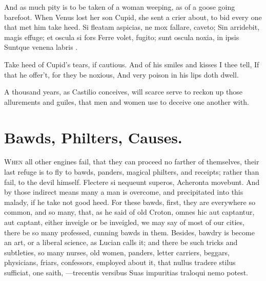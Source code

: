 {And as much pity is to be taken of a woman weeping, as of a goose going
barefoot. When Venus lost her son Cupid, she sent a crier about, to bid
every one that met him take heed.
Si fleatam aspicias, ne mox fallare, caveto;
Sin arridebit, magis effuge; et oscula si fors
Ferre volet, fugito; sunt oscula noxia, in ipsis
Suntque venena labris \etc{}.

Take heed of Cupid's tears, if cautious.
And of his smiles and kisses I thee tell,
If that he offer't, for they be noxious,
And very poison in his lips doth dwell.

A thousand years, as Castilio conceives, will scarce serve to
reckon up those allurements and guiles, that men and women use to
deceive one another with.

\section{Bawds, Philters, Causes.}

\lettrine{W}{hen} all other engines fail, that they can proceed no farther of
themselves, their last refuge is to fly to bawds, panders, magical
philters, and receipts; rather than fail, to the devil himself.
Flectere si nequeunt superos, Acheronta movebunt. And by those indirect
means many a man is overcome, and precipitated into this malady, if he
take not good heed. For these bawds, first, they are everywhere so
common, and so many, that, as he said of old Croton, omnes hic
aut captantur, aut captant, either inveigle or be inveigled, we may say
of most of our cities, there be so many professed, cunning bawds in
them. Besides, bawdry is become an art, or a liberal science, as Lucian
calls it; and there be such tricks and subtleties, so many nurses, old
women, panders, letter carriers, beggars, physicians, friars,
confessors, employed about it, that nullus tradere stilus sufficiat,
one saith,
---trecentis versibus
Suas impuritias traloqui nemo potest.

}
